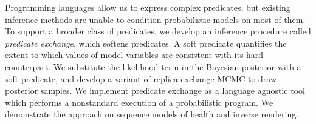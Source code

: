 Programming languages allow us to express complex predicates, but existing inference methods are unable to condition probabilistic models on most of them.
To support a broader class of predicates, we develop an inference procedure called \emph{predicate exchange}, which softens predicates.
A soft predicate quantifies the extent to which values of model variables
are consistent with its hard counterpart.
We substitute the likelihood term in the Bayesian posterior with a soft predicate, and develop a variant of replica exchange MCMC to draw posterior samples.
We implement predicate exchange as a language agnostic tool which performs a nonstandard execution of a probabilistic program. 
We demonstrate the approach on sequence models of health and inverse rendering. 



%       